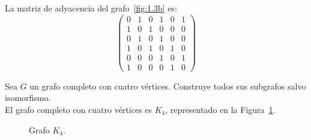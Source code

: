 \begin{ejercicio}
    La matriz de adyacencia del grafo~\ref{fig:1.3b} es:
    \begin{equation*}
        \begin{pmatrix}
            0 & 1 & 0 & 1 & 0 & 1 \\
            1 & 0 & 1 & 0 & 0 & 0 \\
            0 & 1 & 0 & 1 & 0 & 0 \\
            1 & 0 & 1 & 0 & 1 & 0 \\
            0 & 0 & 0 & 1 & 0 & 1 \\
            1 & 0 & 0 & 0 & 1 & 0
        \end{pmatrix}
    \end{equation*}
\end{ejercicio}

\begin{ejercicio}\label{ej:1.4}
    Sea $G$ un grafo completo con cuatro vértices. Construye todos sus subgrafos salvo isomorfismo.\\

    El grafo completo con cuatro vértices es $K_4$, representado en la Figura~\ref{fig:1.4_1}.
    \begin{figure}
        \centering
        \caption{Grafo $K_4$.}
        \label{fig:1.4_1}
    \end{figure}
    

\end{ejercicio}
